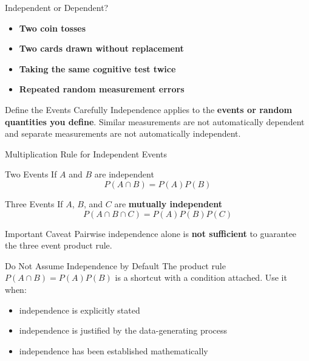 \documentclass[aspectratio=169]{beamer}
\begin{document}
\begin{frame}{Independent or Dependent?}
\begin{itemize}
	\item \textbf{Two coin tosses} 
	\item \textbf{Two cards drawn without replacement}	
	\item \textbf{Taking the same cognitive test twice}
	\item \textbf{Repeated random measurement errors} 
\end{itemize}
\begin{alertblock}{Define the Events Carefully}
Independence applies to the \textbf{events or random quantities you define}. Similar measurements are not automatically dependent and separate measurements are not automatically independent.
  \end{alertblock}
\end{frame}

\begin{frame}{Multiplication Rule for Independent Events}
\begin{block}{Two Events}
If $A$ and $B$ are independent
$$P(A\cap B)=P(A)P(B)$$
\end{block}

\begin{block}{Three Events}
If $A$, $B$, and $C$ are \textbf{mutually independent}
$$P(A\cap B\cap C)=P(A)P(B)P(C)$$
\end{block}
\begin{alertblock}{Important Caveat}
Pairwise independence alone is \textbf{not sufficient} to guarantee the three event product rule.
\end{alertblock}
\end{frame}

\begin{frame}{Do Not Assume Independence by Default}
The product rule $P(A\cap B)=P(A)P(B)$ is a shortcut with a condition attached.
\vspace{0.2cm}
Use it when:
\begin{itemize}
	\item independence is explicitly stated
	\item independence is justified by the data-generating process
	\item independence has been established mathematically
\end{itemize}
\end{frame}
\end{document}

